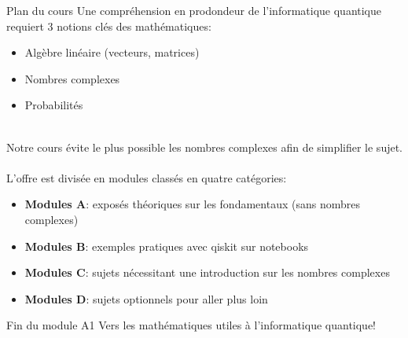 \documentclass[aspectratio=169,12pt]{beamer}
\begin{document}
\begin{frame}{Plan du cours}
  Une compréhension en prodondeur de l'informatique quantique requiert 3 notions clés des mathématiques:
  \begin{itemize}
    \item Algèbre linéaire (vecteurs, matrices)
    \item Nombres complexes
    \item Probabilités
  \end{itemize}
  ~\\
  Notre cours évite le plus possible les nombres complexes afin de simplifier le sujet.\\~\\
  L'offre est divisée en modules classés en quatre catégories:
  \begin{itemize}
    \item \textbf{Modules A}: exposés théoriques sur les fondamentaux (sans nombres complexes)
    \item \textbf{Modules B}: exemples pratiques avec qiskit sur notebooks
    \item \textbf{Modules C}: sujets nécessitant une introduction sur les nombres complexes
    \item \textbf{Modules D}: sujets optionnels pour aller plus loin
  \end{itemize}
\end{frame}

\begin{frame}{Fin du module A1}
  \centering
  Vers les mathématiques utiles à l'informatique quantique!
\end{frame}
\end{document}
